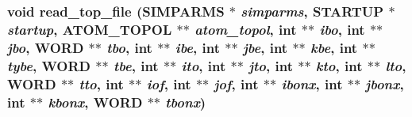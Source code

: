 \subsubsection{\setlength{\rightskip}{0pt plus 5cm}void read\_\-top\_\-file ({\bf SIMPARMS} $\ast$ {\em simparms}, {\bf STARTUP} $\ast$ {\em startup}, {\bf ATOM\_\-TOPOL} $\ast$$\ast$ {\em atom\_\-topol}, int $\ast$$\ast$ {\em ibo}, int $\ast$$\ast$ {\em jbo}, {\bf WORD} $\ast$$\ast$ {\em tbo}, int $\ast$$\ast$ {\em ibe}, int $\ast$$\ast$ {\em jbe}, int $\ast$$\ast$ {\em kbe}, int $\ast$$\ast$ {\em tybe}, {\bf WORD} $\ast$$\ast$ {\em tbe}, int $\ast$$\ast$ {\em ito}, int $\ast$$\ast$ {\em jto}, int $\ast$$\ast$ {\em kto}, int $\ast$$\ast$ {\em lto}, {\bf WORD} $\ast$$\ast$ {\em tto}, int $\ast$$\ast$ {\em iof}, int $\ast$$\ast$ {\em jof}, int $\ast$$\ast$ {\em ibonx}, int $\ast$$\ast$ {\em jbonx}, int $\ast$$\ast$ {\em kbonx}, {\bf WORD} $\ast$$\ast$ {\em tbonx})}\label{input_2md__readparm_8c_b565b7f0ed5bc4e1c86184fd396a9846}


